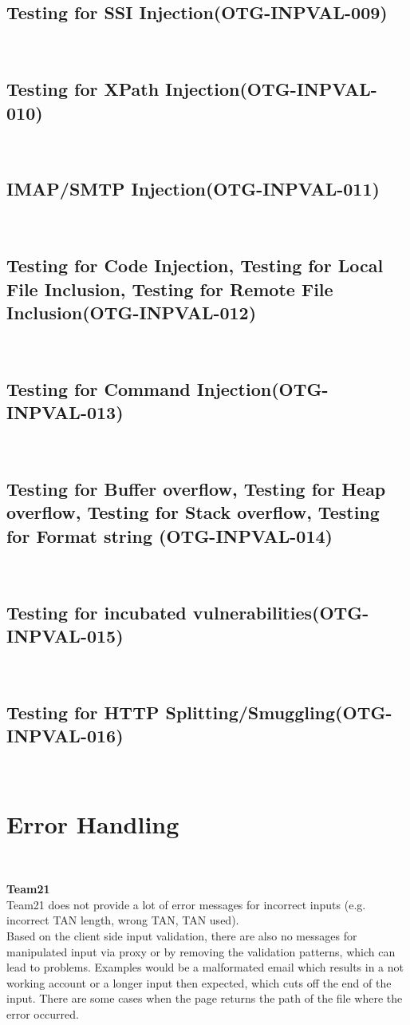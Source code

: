 \documentclass[headsepline,footsepline,footinclude=false,oneside,fontsize=11pt,paper=a4,listof=totoc,bibliography=totoc]{scrbook} %
\begin{document}
\subsection{Testing for SSI Injection(OTG-INPVAL-009)}\
\pagebreak 
\subsection{Testing for XPath Injection(OTG-INPVAL-010)}\
\pagebreak 
\subsection{IMAP/SMTP Injection(OTG-INPVAL-011)}\
\pagebreak 
\subsection{Testing for Code Injection, Testing for Local File Inclusion, Testing for Remote File Inclusion(OTG-INPVAL-012)}\
\pagebreak 
\subsection{Testing for Command Injection(OTG-INPVAL-013)}\
\pagebreak 
\subsection{Testing for Buffer overflow, Testing for Heap overflow, Testing for Stack overflow, Testing for Format string (OTG-INPVAL-014)}\
\pagebreak 
\subsection{Testing for incubated vulnerabilities(OTG-INPVAL-015)}\
\pagebreak 
\subsection{Testing for HTTP Splitting/Smuggling(OTG-INPVAL-016)}\

\section{Error Handling}\

\textbf{Team21}\\

Team21 does not provide a lot of error messages for incorrect inputs (e.g. incorrect TAN
length, wrong TAN, TAN used). \\ 
Based on the client side input validation, there are also no messages for manipulated input via proxy or by removing the validation patterns, which can lead to problems. Examples would be a malformated email which results in a not working account or a longer input then expected, which cuts off the end of the input. There are some cases when the page returns the path of the file where the error occurred.\\   
 
\end{document}
